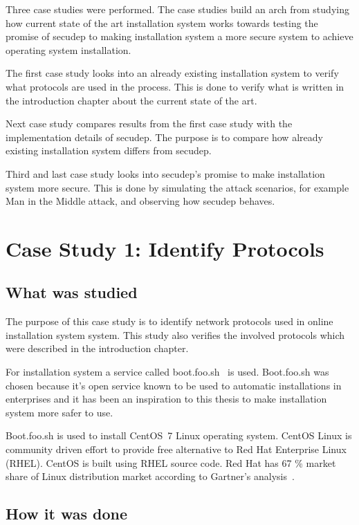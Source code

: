 
Three case studies were performed. The case studies build an arch from
studying how current state of the art installation system works
towards testing the promise of secudep to making installation system a
more secure system to achieve operating system installation.

The first case study looks into an already existing installation
system to verify what protocols are used in the process. This is done
to verify what is written in the introduction chapter about the
current state of the art.

Next case study compares results from the first case study with the
implementation details of secudep. The purpose is to compare how
already existing installation system differs from secudep.

Third and last case study looks into secudep's promise to make
installation system more secure. This is done by simulating the attack
scenarios, for example Man in the Middle attack, and observing how
secudep behaves.


\section{Case Study 1: Identify Protocols}
\label{sec:casestudy1}

\subsection{What was studied}

The purpose of this case study is to identify network protocols used
in online installation system system. This study also verifies the
involved protocols which were described in the introduction chapter.

For installation system a service called
boot.foo.sh~\cite{boot-foo-sh} is used. Boot.foo.sh was chosen because
it's open service known to be used to automatic installations in
enterprises and it has been an inspiration to this thesis to make
installation system more safer to use.

Boot.foo.sh is used to install CentOS~7 Linux operating system. CentOS
Linux is community driven effort to provide free alternative to Red
Hat Enterprise Linux (RHEL). CentOS is built using RHEL source
code. Red Hat has 67 \% market share of Linux distribution market
according to Gartner's analysis~\cite{gartner-redhat}.

\subsection{How it was done}

